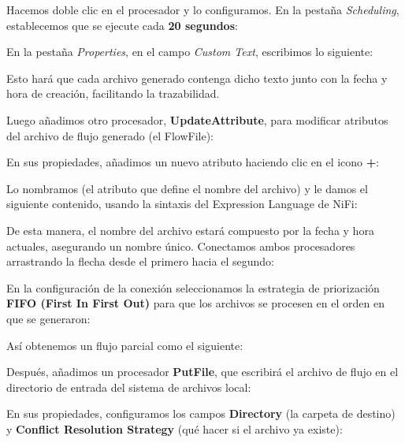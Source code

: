 \documentclass{../../../miPlantilla}
\begin{document}

\newpage

Hacemos doble clic en el procesador y lo configuramos. En la pestaña \textit{Scheduling}, establecemos que se ejecute cada \textbf{20 segundos}:


En la pestaña \textit{Properties}, en el campo \textit{Custom Text}, escribimos lo siguiente:


Esto hará que cada archivo generado contenga dicho texto junto con la fecha y hora de creación, facilitando la trazabilidad.  

Luego añadimos otro procesador, \textbf{UpdateAttribute}, para modificar atributos del archivo de flujo generado (el FlowFile):


\newpage

En sus propiedades, añadimos un nuevo atributo haciendo clic en el icono \textbf{+}:


Lo nombramos  (el atributo que define el nombre del archivo) y le damos el siguiente contenido, usando la sintaxis del Expression Language de NiFi:


De esta manera, el nombre del archivo estará compuesto por la fecha y hora actuales, asegurando un nombre único. 
Conectamos ambos procesadores arrastrando la flecha desde el primero hacia el segundo:


En la configuración de la conexión seleccionamos la estrategia de priorización \textbf{FIFO (First In First Out)} para que los archivos se procesen en el orden en que se generaron:


Así obtenemos un flujo parcial como el siguiente:


Después, añadimos un procesador \textbf{PutFile}, que escribirá el archivo de flujo en el directorio de entrada del sistema de archivos local:


\newpage

En sus propiedades, configuramos los campos \textbf{Directory} (la carpeta de destino) y \textbf{Conflict Resolution Strategy} (qué hacer si el archivo ya existe):
\end{document}
